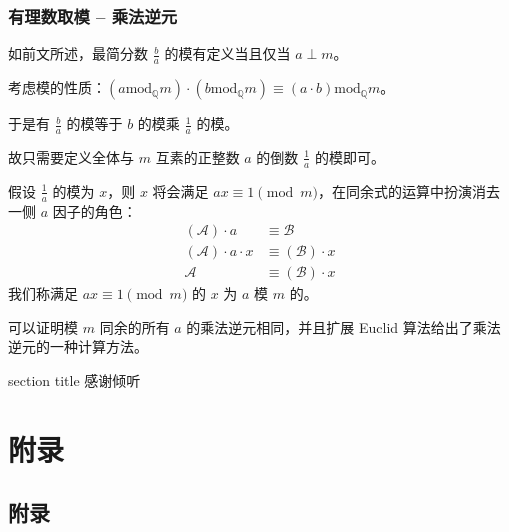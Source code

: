 \documentclass{../pkslide}
\begin{document}
\begin{frame}
  \frametitle{有理数取模 -- 乘法逆元}
  如前文所述，最简分数 $\frac{b}{a}$ 的模有定义当且仅当 $a \perp m$。
  
  考虑模的性质：$(a \mathbin{\mathrm{mod}_{\mathbb Q}} m) \cdot (b \mathbin{\mathrm{mod}_{\mathbb Q}} m) \equiv (a \cdot b) \mathbin{\mathrm{mod}_{\mathbb Q}} m$。
  
  于是有 $\frac{b}{a}$ 的模等于 $b$ 的模乘 $\frac{1}{a}$ 的模。
  
  故只需要定义全体与 $m$ 互素的正整数 $a$ 的倒数 $\frac{1}{a}$ 的模即可。
  
  假设 $\frac{1}{a}$ 的模为 $x$，则 $x$ 将会满足 $a x \equiv 1 \pmod{m}$，在同余式的运算中扮演消去一侧 $a$ 因子的角色：%
  \begin{align*}
    (\mathcal A) \cdot a &\equiv \mathcal B \\
    (\mathcal A) \cdot a \cdot x &\equiv (\mathcal B) \cdot x \\
    \mathcal A &\equiv (\mathcal B) \cdot x
  \end{align*}%
  我们称满足 $a x \equiv 1 \pmod{m}$ 的 $x$ 为 $a$ 模 $m$ 的。
  
  可以证明模 $m$ 同余的所有 $a$ 的乘法逆元相同，并且扩展 Euclid 算法给出了乘法逆元的一种计算方法。
\end{frame}

\begin{frame}[c]
  \centering
  \begin{beamercolorbox}[sep = 12pt, center]{section title}
    感谢倾听\par
  \end{beamercolorbox}
\end{frame}


\section{附录}
\subsection*{附录}
\end{document}
